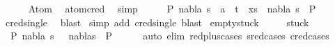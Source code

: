 \begin{isabellebody}
\ \ \ \ \isamarkupfalse%
\ Atom\ \isamarkupfalse%
\ atom{\isacharunderscore}{\kern0pt}cred\ \isamarkupfalse%
\ simp\isanewline
\ \ \isamarkupfalse%
\ \isamarkupfalse%
\ {\isachardoublequoteopen}{\isasymexists}P{}\ nabla\ s{\isachardot}{\kern0pt}\ {\isacharparenleft}{\kern0pt}{\isacharbrackleft}{\kern0pt}{\isacharbrackright}{\kern0pt}{\isacharcomma}{\kern0pt}\ {\isacharparenleft}{\kern0pt}a\ {\isasymsharp}{\isacharquery}{\kern0pt}\ t{\isacharparenright}{\kern0pt}\ {\isacharhash}{\kern0pt}\ xs{\isacharparenright}{\kern0pt}\ {\isasymTurnstile}\ {\isacharparenleft}{\kern0pt}nabla{\isacharcomma}{\kern0pt}\ s{\isacharparenright}{\kern0pt}\ {\isasymRightarrow}\ P{}{\isachardoublequoteclose}\isanewline
\ \ \ \ \isamarkupfalse%
\ cred{\isacharunderscore}{\kern0pt}single\ \isamarkupfalse%
\ blast\isanewline
{}\isamarkupfalse%
\ {\isacharparenleft}{\kern0pt}simp\ add{\isacharcolon}{\kern0pt}\ cred{\isacharunderscore}{\kern0pt}single{\isacharcomma}{\kern0pt}\ blast{\isacharplus}{\kern0pt}{\isacharparenright}{\kern0pt}%
\endisatagproof
{\isafoldproof}%
%
\isadelimproof
\isanewline
%
\endisadelimproof
\isanewline
\isanewline
{}\isamarkupfalse%
\ empty{\isacharunderscore}{\kern0pt}stuck{\isacharcolon}{\kern0pt}\isanewline
\ \ \ {\isachardoublequoteopen}{\isacharparenleft}{\kern0pt}{\isacharbrackleft}{\kern0pt}{\isacharbrackright}{\kern0pt}{\isacharcomma}{\kern0pt}{\isacharbrackleft}{\kern0pt}{\isacharbrackright}{\kern0pt}{\isacharparenright}{\kern0pt}\ {\isasymin}\ stuck{\isachardoublequoteclose}\isanewline
%
\isadelimproof
%
\endisadelimproof
%
\isatagproof
{}\isamarkupfalse%
{\isacharminus}{\kern0pt}\isanewline
\ \ \isamarkupfalse%
\ {\isachardoublequoteopen}{\isasymnot}\ {\isacharparenleft}{\kern0pt}{\isasymexists}P{}\ nabla\ s{\isachardot}{\kern0pt}\ {\isacharparenleft}{\kern0pt}{\isacharbrackleft}{\kern0pt}{\isacharbrackright}{\kern0pt}{\isacharcomma}{\kern0pt}{\isacharbrackleft}{\kern0pt}{\isacharbrackright}{\kern0pt}{\isacharparenright}{\kern0pt}\ {\isasymTurnstile}\ {\isacharparenleft}{\kern0pt}nabla{\isacharcomma}{\kern0pt}s{\isacharparenright}{\kern0pt}\ {\isasymRightarrow}\ P{}{\isacharparenright}{\kern0pt}{\isachardoublequoteclose}\isanewline
\ \ \ \ \isamarkupfalse%
\ {\isacharparenleft}{\kern0pt}auto\ elim{\isacharcolon}{\kern0pt}\ red{\isacharunderscore}{\kern0pt}plus{\isachardot}{\kern0pt}cases\ s{\isacharunderscore}{\kern0pt}red{\isachardot}{\kern0pt}cases\ c{\isacharunderscore}{\kern0pt}red{\isachardot}{\kern0pt}cases{\isacharparenright}{\kern0pt}\isanewline

\end{isabellebody}
